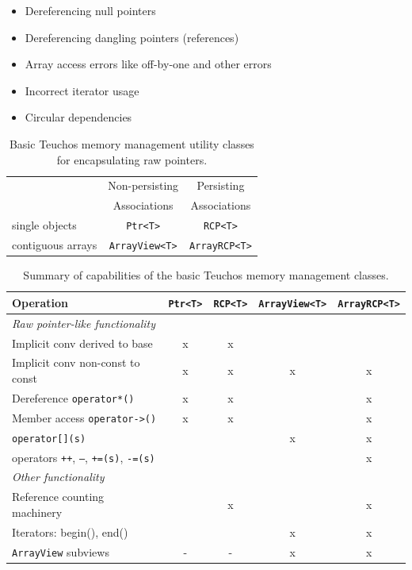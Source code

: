 \documentclass[pdf,ps2pdf,11pt]{SANDreport}
\begin{document}
\begin{itemize}
  \begin{itemize}
  {}\item Dereferencing null pointers
  {}\item Dereferencing dangling pointers (references)
  {}\item Array access errors like off-by-one and other errors
  {}\item Incorrect iterator usage
  {}\item Circular dependencies
  \end{itemize}

\end{itemize}


\begin{table}
\begin{center}
\begin{tabular}{|l|c|c|}
\hline
& Non-persisting
& Persisting \\
& Associations
& Associations \\
\hline
single objects
& {}\texttt{Ptr<T>}
& {}\texttt{RCP<T>} \\
\hline
contiguous arrays
& {}\texttt{ArrayView<T>}
& {}\texttt{ArrayRCP<T>} \\
\hline
\end{tabular}
\end{center}
\caption{\label{table:BasicSingleArrayTypes}
Basic Teuchos memory management utility classes for encapsulating raw
pointers.}
\end{table}


\begin{table}
\begin{center}
\begin{tabular}{|l|c|c|c|c|}
%
\hline
%
Operation
& \texttt{Ptr<T>}
& \texttt{RCP<T>}
& \texttt{ArrayView<T>}
& \texttt{ArrayRCP<T>} \\
%
\hline
%
\multicolumn{5}{l}{\textit{Raw pointer-like functionality}} \\
%
\hline
%
Implicit conv derived to base
& x
& x
& 
&  \\
%
\hline
%
Implicit conv non-const to const
& x
& x
& x
& x \\
%
\hline
%
Dereference \texttt{operator*()}
& x
& x
& 
& x \\
%
\hline
%
Member access \texttt{operator->()}
& x
& x
& 
& x \\
%
\hline
%
\texttt{operator[](s)}
& 
& 
& x
& x \\
%
\hline
%
operators \texttt{++}, \texttt{--}, \texttt{+=(s)}, \texttt{-=(s)}
& 
& 
& 
& x \\
%
\hline
%
\multicolumn{5}{l}{\textit{Other functionality}} \\
%
\hline
%
Reference counting machinery
& 
& x
& 
& x \\
%
\hline
%
Iterators: begin(), end()
& 
& 
& x
& x \\
%
\hline
%
\texttt{ArrayView} subviews
& -
& -
& x
& x \\
%
\hline
%
\end{tabular}
\end{center}
\caption{\label{table:TypesSummary}
Summary of capabilities of the basic Teuchos memory management
classes.}
\end{table}
\end{document}
